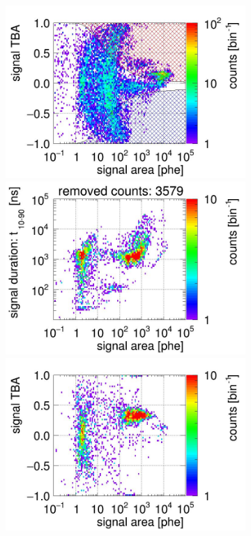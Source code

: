 \begin{landscape}
\begin{figure}[!p]
\begin{subfigure}[t]{0.32\textwidth}
			\includegraphics[width=\figurewidth,clip,trim={0 98 0 40}]{Figures/GasTest/CutsValid/res64767/tbapa26Vecfig64767.jpg}
			\includegraphics[width=\figurewidth,clip,trim={0 98 0 15}]{Figures/GasTest/CutsValid/res64767/pdpaX26Vecfig64767.jpg}
			\includegraphics[width=\figurewidth,clip,trim={0 8 0 40}]{Figures/GasTest/CutsValid/res64767/tbapaX26Vecfig64767.jpg}

\end{subfigure}
\end{figure}
\end{landscape}
